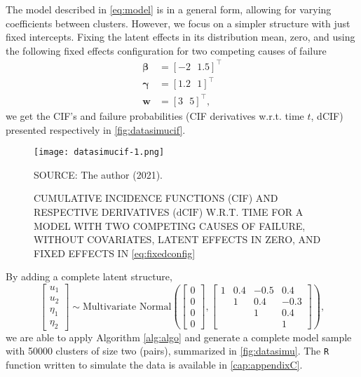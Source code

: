 The model described in \autoref{eq:model} is in a general form, allowing
for varying coefficients between clusters. However, we focus on a
simpler structure with just fixed intercepts. Fixing the latent effects
in its distribution mean, zero, and using the following fixed effects
configuration for two competing causes of failure
\begin{align}
 \bm{\beta} &= [-2~~~1.5]^{\top}\nonumber\\
 \bm{\gamma} &= [1.2~~~1]^{\top}\label{eq:fixedconfig}\\
 \bm{w} &= [3~~~5]^{\top}\nonumber,
\end{align}
we get the CIF's and failure probabilities (CIF derivatives w.r.t. time
\(t\), dCIF) presented respectively in \autoref{fig:datasimucif}.

\begin{figure}[H]
 \setlength{\abovecaptionskip}{.0001pt}
 \caption{CUMULATIVE INCIDENCE FUNCTIONS (CIF) AND RESPECTIVE
          DERIVATIVES (\(\text{dCIF}\)) W.R.T. TIME FOR A MODEL WITH
          TWO COMPETING CAUSES OF FAILURE, WITHOUT COVARIATES, LATENT
          EFFECTS IN ZERO, AND FIXED EFFECTS IN
          \autoref{eq:fixedconfig}}
 \vspace{0.2cm}\centering
 \texttt{[image: datasimucif-1.png]}\\
 \begin{footnotesize}
  SOURCE: The author (2021).
 \end{footnotesize}
 \label{fig:datasimucif}
\end{figure}

By adding a complete latent structure,
\begin{equation}
 \begin{bmatrix} u_{1}\\u_{2}\\\eta_{1}\\\eta_{2} \end{bmatrix}
 \sim\text{Multivariate Normal}
 \left(\begin{bmatrix} 0\\0\\0\\0 \end{bmatrix},
       \begin{bmatrix}
        1&0.4&-0.5& 0.4\\
         &  1& 0.4&-0.3\\
                &&1&0.4\\
                   &&&1
       \end{bmatrix}
 \right),\label{eq:latentconfig}
\end{equation}
we are able to apply Algorithm \autoref{alg:algo} and generate a
complete model sample with 50000 clusters of size two (pairs),
summarized in \autoref{fig:datasimu}. The \texttt{R} function written to
simulate the data is available in \autoref{cap:appendixC}.

